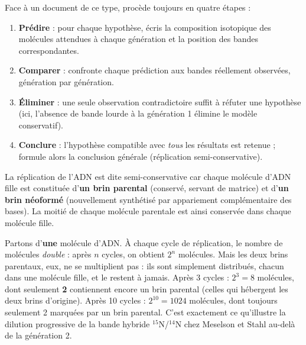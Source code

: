 \documentclass[11pt]{article}
\newcommand{\cle}[1]{{\popxbold\color{popdark}#1}}
\begin{document}
\begin{methode}
Face à un document de ce type, procède toujours en quatre étapes :
\begin{enumerate}
\item \textbf{Prédire} : pour chaque hypothèse, écris la composition isotopique des molécules attendues à chaque génération et la position des bandes correspondantes.
\item \textbf{Comparer} : confronte chaque prédiction aux bandes réellement observées, génération par génération.
\item \textbf{Éliminer} : une seule observation contradictoire suffit à réfuter une hypothèse (ici, l'absence de bande lourde à la génération 1 élimine le modèle conservatif).
\item \textbf{Conclure} : l'hypothèse compatible avec \emph{tous} les résultats est retenue ; formule alors la conclusion générale (réplication semi-conservative).
\end{enumerate}
\end{methode}

\begin{definition}
La réplication de l'ADN est dite \cle{semi-conservative} car chaque molécule d'ADN fille est constituée d'\textbf{un brin parental} (conservé, servant de matrice) et d'\textbf{un brin néoformé} (nouvellement synthétisé par appariement complémentaire des bases). La moitié de chaque molécule parentale est ainsi conservée dans chaque molécule fille.
\end{definition}

\begin{exemplebox}
Partons d'\textbf{une} molécule d'ADN. À chaque cycle de réplication, le nombre de molécules \emph{double} : après $n$ cycles, on obtient $2^{n}$ molécules. Mais les deux brins parentaux, eux, ne se multiplient pas : ils sont simplement distribués, chacun dans une molécule fille, et le restent à jamais. Après 3 cycles : $2^{3} = 8$ molécules, dont seulement \textbf{2} contiennent encore un brin parental (celles qui hébergent les deux brins d'origine). Après 10 cycles : $2^{10} = 1024$ molécules, dont toujours seulement 2 marquées par un brin parental. C'est exactement ce qu'illustre la dilution progressive de la bande hybride $^{15}$N/$^{14}$N chez Meselson et Stahl au-delà de la génération 2.
\end{exemplebox}
\end{document}
